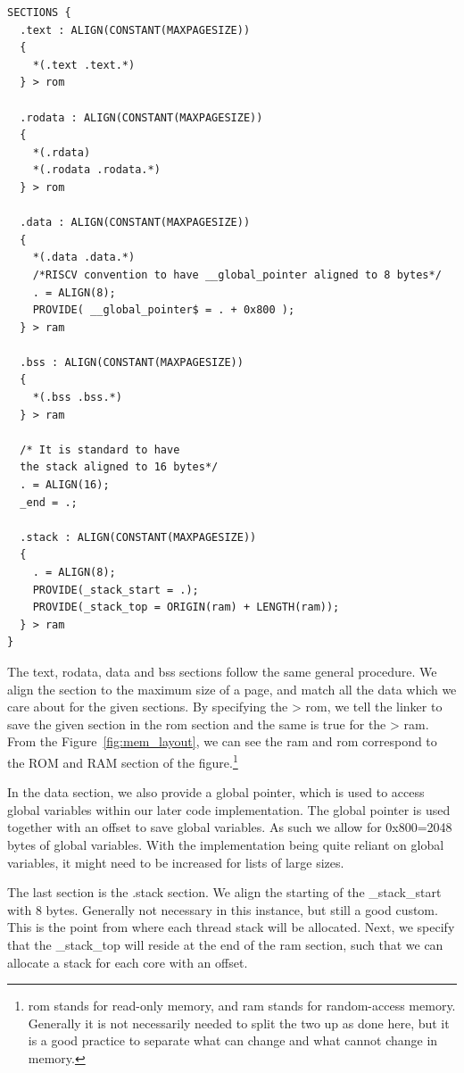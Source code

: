 \begin{lstlisting}[caption=Linker scripts SECTIONS.]
SECTIONS {
  .text : ALIGN(CONSTANT(MAXPAGESIZE))
  {
    *(.text .text.*)
  } > rom

  .rodata : ALIGN(CONSTANT(MAXPAGESIZE))
  {
    *(.rdata)
    *(.rodata .rodata.*)
  } > rom

  .data : ALIGN(CONSTANT(MAXPAGESIZE))
  {
    *(.data .data.*)
    /*RISCV convention to have __global_pointer aligned to 8 bytes*/
    . = ALIGN(8);
    PROVIDE( __global_pointer$ = . + 0x800 );
  } > ram

  .bss : ALIGN(CONSTANT(MAXPAGESIZE))
  {
    *(.bss .bss.*)
  } > ram

  /* It is standard to have
  the stack aligned to 16 bytes*/
  . = ALIGN(16);
  _end = .;

  .stack : ALIGN(CONSTANT(MAXPAGESIZE))
  {
    . = ALIGN(8);
    PROVIDE(_stack_start = .);
    PROVIDE(_stack_top = ORIGIN(ram) + LENGTH(ram));
  } > ram
}
\end{lstlisting}
The text, rodata, data and bss sections follow the same general procedure. We
align the section to the maximum size of a page, and match all the data which we
care about for the given sections. By specifying the > rom, we tell the linker
to save the given section in the rom section and the same is true for the > ram.
From the Figure~\ref{fig:mem_layout}, we can see the ram and rom correspond to
the ROM and RAM section of the figure.\footnote{rom stands for read-only memory,
and ram stands for random-access memory. Generally it is not necessarily needed
to split the two up as done here, but it is a good practice to separate what can
change and what cannot change in memory.}

In the data section, we also provide a global pointer, which is used to access
global variables within our later code implementation. The global pointer is
used together with an offset to save global variables. As such we allow for
0x800=2048 bytes of global variables. With the implementation being quite
reliant on global variables, it might need to be increased for lists of large
sizes.

The last section is the .stack section. We align the starting of the
\_stack\_start with 8 bytes. Generally not necessary in this instance, but still
a good custom. This is the point from where each thread stack will be allocated.
Next, we specify that the \_stack\_top will reside at the end of the ram
section, such that we can allocate a stack for each core with an offset.

